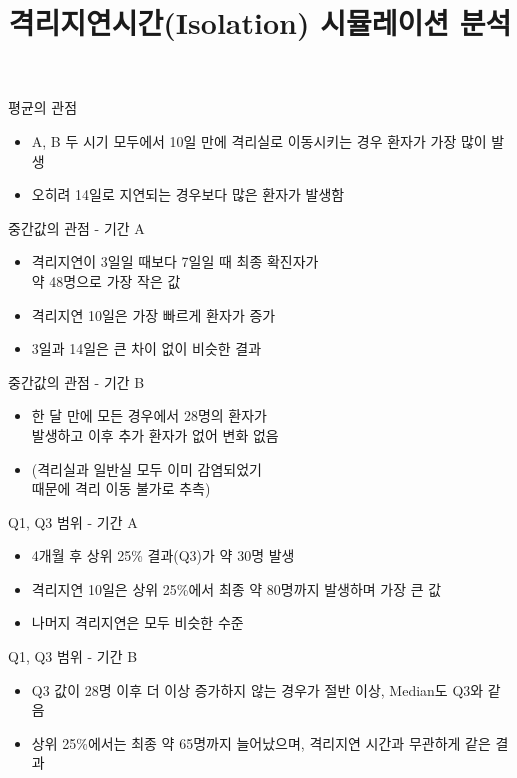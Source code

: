 \documentclass[8pt]{beamer}
\title{격리지연시간(Isolation) 시뮬레이션 분석}
\author{}
\date{}
\begin{document}
\frame{\titlepage}

\begin{frame}{평균의 관점}
\small
\begin{itemize}
    \item A, B 두 시기 모두에서 10일 만에 격리실로 이동시키는 경우
    환자가 가장 많이 발생
    \item 오히려 14일로 지연되는 경우보다 많은 환자가 발생함
\end{itemize}
\end{frame}

\begin{frame}{중간값의 관점 - 기간 A}
\small
\begin{itemize}
    \item 격리지연이 3일일 때보다 7일일 때 최종 확진자가 \\약 48명으로
    가장 작은 값
    \item 격리지연 10일은 가장 빠르게 환자가 증가
    \item 3일과 14일은 큰 차이 없이 비슷한 결과
\end{itemize}
\end{frame}

\begin{frame}{중간값의 관점 - 기간 B}
\small
\begin{itemize}
    \item 한 달 만에 모든 경우에서 28명의 환자가 \\발생하고
    이후 추가 환자가 없어 변화 없음
    \item (격리실과 일반실 모두 이미 감염되었기 \\때문에 격리 이동 불가로 추측)
\end{itemize}
\end{frame}

\begin{frame}{Q1, Q3 범위 - 기간 A}
\small
\begin{itemize}
    \item 4개월 후 상위 25\% 결과(Q3)가 약 30명 발생
    \item 격리지연 10일은 상위 25\%에서 최종 약 80명까지 발생하며
    가장 큰 값
    \item 나머지 격리지연은 모두 비슷한 수준
\end{itemize}
\end{frame}

\begin{frame}{Q1, Q3 범위 - 기간 B}
\small
\begin{itemize}
    \item Q3 값이 28명 이후 더 이상 증가하지 않는 경우가 절반 이상,
    Median도 Q3와 같음
    \item 상위 25\%에서는 최종 약 65명까지 늘어났으며,
    격리지연 시간과 무관하게 같은 결과
\end{itemize}
\end{frame}
\end{document}
